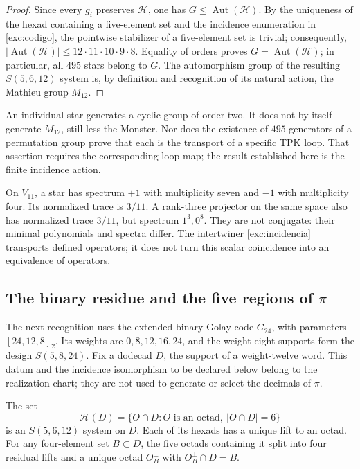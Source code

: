 \begin{proof}
Since every $g_i$ preserves $\mathcal H$, one has
$G\leq\operatorname{Aut}(\mathcal H)$. By the uniqueness of the hexad
containing a five-element set and the incidence enumeration in
\eqref{exc:codigo}, the pointwise stabilizer of a five-element set is
trivial; consequently,
$|\operatorname{Aut}(\mathcal H)|\leq
12\cdot11\cdot10\cdot9\cdot8$. Equality of orders proves
$G=\operatorname{Aut}(\mathcal H)$; in particular, all $495$ stars belong
to $G$. The automorphism group of the resulting $S(5,6,12)$ system is, by
definition and recognition of its natural action, the Mathieu group $M_{12}$.
\end{proof}

An individual star generates a cyclic group of order two. It does
not by itself generate $M_{12}$, still less the Monster. Nor does the
existence of $495$ generators of a permutation group prove that
each is the transport of a specific TPK loop. That assertion
requires the corresponding loop map; the result established here
is the finite incidence action.

\begin{remark}
On $V_{11}$, a star has spectrum $+1$ with multiplicity seven
and $-1$ with multiplicity four. Its normalized trace is $3/11$.
A rank-three projector on the same space also has normalized
trace $3/11$, but spectrum $1^3,0^8$. They are not conjugate: their
minimal polynomials and spectra differ. The intertwiner
\eqref{exc:incidencia} transports defined operators; it does not turn
this scalar coincidence into an equivalence of operators.
\end{remark}

\subsection{The binary residue and the five regions of \texorpdfstring{$\pi$}{pi}}
\label{exc:cinco-regiones}

The next recognition uses the extended binary Golay code
$G_{24}$, with parameters $[24,12,8]_2$. Its weights are
$0,8,12,16,24$, and the weight-eight supports form the design
$S(5,8,24)$. Fix a dodecad $D$, the support of a weight-twelve
word. This datum and the incidence isomorphism to be declared
below belong to the realization chart; they are not used to
generate or select the decimals of $\pi$.

\begin{proposition}
\label{exc:residuo-binario}
The set
\[
 \mathcal H(D)=
 \{O\cap D: O\text{ is an octad},\ |O\cap D|=6\}
\]
is an $S(5,6,12)$ system on $D$. Each of its hexads has
a unique lift to an octad. For any four-element set $B\subset D$,
the five octads containing it split into four residual
lifts and a unique octad $O_B^\perp$ with $O_B^\perp\cap D=B$.
\end{proposition}

